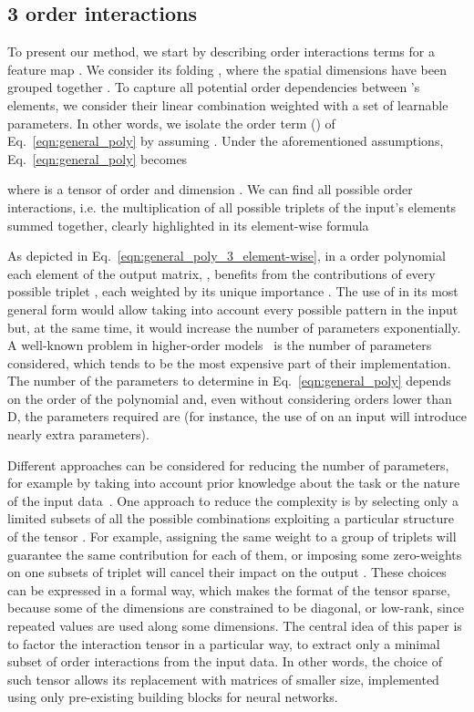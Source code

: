 \documentclass[10pt,twocolumn,letterpaper]{article}
\begin{document}
\subsection{ 3 order interactions}
To present our method, we start by describing  order interactions terms for a feature map . We consider its folding , where the spatial dimensions have been grouped together . To capture all potential  order dependencies between 's elements, we consider their linear combination weighted with a set of learnable parameters. In other words, we isolate the  order term () of Eq.~\eqref{eqn:general_poly} by assuming . Under the aforementioned assumptions, Eq.~\eqref{eqn:general_poly} becomes 

where  is a tensor of order  and dimension . We can find all possible  order interactions, i.e. the multiplication of all possible triplets of the input's elements summed together, clearly highlighted in its element-wise formula 

As depicted in Eq.~\eqref{eqn:general_poly_3_element-wise}, in a  order polynomial each element of the output matrix, , benefits from the contributions of every possible triplet , each weighted by its unique importance . The use of  in its most general form would allow taking into account every possible pattern in the input but, at the same time, it would increase the number of parameters exponentially. A well-known problem in higher-order models~\cite{ sejnowski1986higher, chrysos2020p} is the number of parameters considered, which tends to be the most expensive part of their implementation. The number of the parameters to determine in Eq.~\eqref{eqn:general_poly} depends on the order of the polynomial and, even without considering orders lower than D, the parameters required are  (for instance, the use of  on an input  will introduce nearly extra  parameters).


Different approaches can be considered for reducing the number of parameters, for example by taking into account prior knowledge about the task or the nature of the input data~\cite{kolda2009tensor, memisevic2010learning}. One approach to reduce the complexity is by selecting only a limited subsets of all the possible combinations  exploiting a particular structure of the tensor . For example, assigning the same weight to a group of triplets will guarantee the same contribution for each of them, or imposing some zero-weights on one subsets of triplet will cancel their impact on the output . These choices can be expressed in a formal way, which makes the format of the  tensor sparse, because some of the dimensions are constrained to be diagonal, or low-rank, since repeated values are used along some dimensions. 
The central idea of this paper is to factor the interaction tensor  in a particular way, to extract only a minimal subset of  order interactions from the input data.
In other words, the choice of such tensor allows its replacement with matrices of smaller size, implemented using only pre-existing building blocks for neural networks. 
\end{document}
